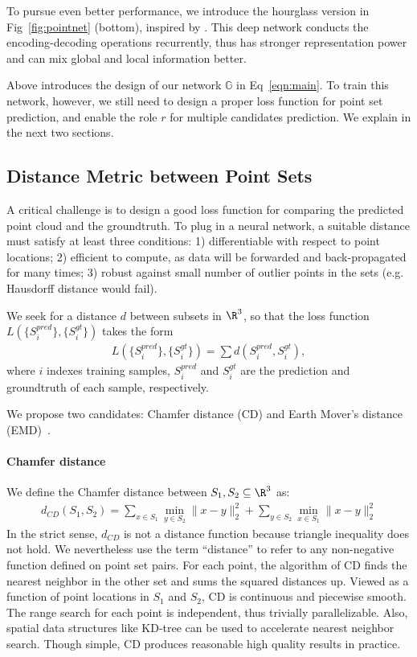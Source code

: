 \documentclass[10pt,twocolumn,letterpaper]{article}
\begin{document}
To pursue even better performance, we introduce the hourglass version in Fig~\ref{fig:pointnet} (bottom), inspired by \cite{newell2016stacked}. This deep network conducts the encoding-decoding operations recurrently, thus has stronger representation power and can mix global and local information better. 

Above introduces the design of our network $\mathbb{G}$ in Eq~\ref{eqn:main}. To train this network, however, we still need to design a proper loss function for point set prediction, and enable the role $r$ for multiple candidates prediction. We explain in the next two sections.
\subsection{Distance Metric between Point Sets}\label{sec:method:loss}
A critical challenge is to design a good loss function for comparing the predicted point cloud and the groundtruth. To plug in a neural network, a suitable distance must satisfy at least three conditions: 1) differentiable with respect to point locations; 2) efficient to compute, as data will be forwarded and back-propagated for many times; 3) robust against small number of outlier points in the sets (e.g. Hausdorff distance would fail).

We seek for a distance $d$ between subsets in $\R^3$, so that the loss function $L(\{S^{pred}_i\}, \{S^{gt}_i\})$ takes the form
\begin{align}
    L(\{S^{pred}_i\}, \{S^{gt}_i\}) = \sum d(S^{pred}_i, S^{gt}_i),
    \label{eqn:loss}
\end{align}
where $i$ indexes training samples, $S_i^{pred}$ and $S_i^{gt}$ are the prediction and groundtruth of each sample, respectively.

We propose two candidates: Chamfer distance (CD) and Earth Mover's distance (EMD)~\cite{rubner2000earth}.

\paragraph{Chamfer distance} We define the Chamfer distance between $S_1, S_2\subseteq \R^3$ as:
\begin{align*}
d_{CD}(S_1, S_2)=\sum_{x\in S_1}\min_{y\in S_2} \|x-y\|^2_2+\sum_{y\in S_2}\min_{x\in S_1} \|x-y\|^2_2
\end{align*}
In the strict sense, $d_{CD}$ is not a distance function because triangle inequality does not hold. We nevertheless use the term ``distance'' to refer to any non-negative function defined on point set pairs. For each point, the algorithm of CD finds the nearest neighbor in the other set and sums the squared distances up.   Viewed as a function of point locations in $S_1$ and $S_2$, $\mbox{CD}$ is continuous and piecewise smooth. The range search for each point is independent, thus trivially parallelizable. Also, spatial data structures like KD-tree can be used to accelerate nearest neighbor search. Though simple, CD produces reasonable high quality results in practice.
\end{document}
